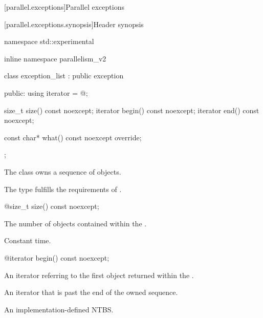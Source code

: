 
[parallel.exceptions]{Parallel exceptions}

[parallel.exceptions.synopsis]{Header  synopsis}

\begin{codeblock}
namespace std::experimental {
inline namespace parallelism_v2 {

  class exception_list : public exception
  {
    public:
      using iterator = @\unspec@;

      size_t size() const noexcept;
      iterator begin() const noexcept;
      iterator end() const noexcept;

      const char* what() const noexcept override;
  };
}
}
\end{codeblock}

\pnum The class  owns a sequence of  objects.

\pnum The type  fulfills the requirements of .

\begin{itemdecl}
@\pnum@ size_t size() const noexcept;
\end{itemdecl}

\begin{itemdescr}
  \pnum \returns The number of  objects contained within the .

  \pnum \complexity Constant time.
\end{itemdescr}

\begin{itemdecl}
@\pnum@ iterator begin() const noexcept;
\end{itemdecl}

\begin{itemdescr}
  \pnum \returns An iterator referring to the first  object returned within the .
\end{itemdescr}

\begin{itemdescr}
  \pnum \returns An iterator that is past the end of the owned sequence.
\end{itemdescr}

\begin{itemdescr}
  \pnum \returns An implementation-defined NTBS.
\end{itemdescr}

